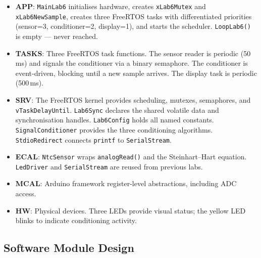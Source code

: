 \documentclass[12pt]{article}
\begin{document}
\begin{itemize}
  \item \textbf{APP}: \texttt{MainLab6} initialises hardware, creates \texttt{xLab6Mutex} and \texttt{xLab6NewSample}, creates three FreeRTOS tasks with differentiated priorities (sensor=3, conditioner=2, display=1), and starts the scheduler. \texttt{LoopLab6()} is empty --- never reached.
  \item \textbf{TASKS}: Three FreeRTOS task functions. The sensor reader is periodic (50\,ms) and signals the conditioner via a binary semaphore. The conditioner is event-driven, blocking until a new sample arrives. The display task is periodic (500\,ms).
  \item \textbf{SRV}: The FreeRTOS kernel provides scheduling, mutexes, semaphores, and \texttt{vTaskDelayUntil}. \texttt{Lab6Sync} declares the shared volatile data and synchronisation handles. \texttt{Lab6Config} holds all named constants. \texttt{SignalConditioner} provides the three conditioning algorithms. \texttt{StdioRedirect} connects \texttt{printf} to \texttt{SerialStream}.
  \item \textbf{ECAL}: \texttt{NtcSensor} wraps \texttt{analogRead()} and the Steinhart--Hart equation. \texttt{LedDriver} and \texttt{SerialStream} are reused from previous labs.
  \item \textbf{MCAL}: Arduino framework register-level abstractions, including ADC access.
  \item \textbf{HW}: Physical devices. Three LEDs provide visual status; the yellow LED blinks to indicate conditioning activity.
\end{itemize}

\subsection{Software Module Design}
\end{document}
